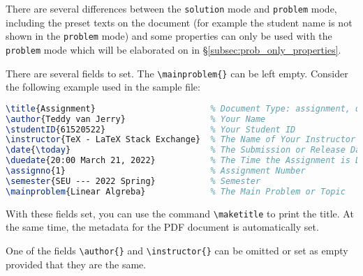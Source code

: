 \documentclass[twoside]{seu-ml-assign}
\begin{document}
    There are several differences between the \texttt{solution} mode and \texttt{problem} mode,
    including the preset texts on the document (for example the student name is not shown in the \texttt{problem} mode) and some properties can only be used with the \texttt{problem} mode which will be elaborated on in \S\ref{subsec:prob_only_properties}.



      There are several fields to set.
      The \verb|\mainproblem{}| can be left empty.
      Consider the following example used in the sample file:
      \begin{lstlisting}[language=tex,numbers=none]
\title{Assignment}                       % Document Type: assignment, quiz, etc.
\author{Teddy van Jerry}                 % Your Name
\studentID{61520522}                     % Your Student ID
\instructor{TeX - LaTeX Stack Exchange}  % The Name of Your Instructor
\date{\today}                            % The Submission or Release Date
\duedate{20:00 March 21, 2022}           % The Time the Assignment is Due
\assignno{1}                             % Assignment Number
\semester{SEU --- 2022 Spring}           % Semester
\mainproblem{Linear Algreba}             % The Main Problem or Topic
      \end{lstlisting}
    
      With these fields set, you can use the command \verb|\maketitle| to print the title.
      At the same time, the metadata for the PDF document is automatically set.

    \label{subsec:prob_only_properties}
    One of the fields \verb|\author{}| and \verb|\instructor{}| can be omitted or set as empty provided that they are the same.


    \label{subsec:section_normal_title}
\end{document}
